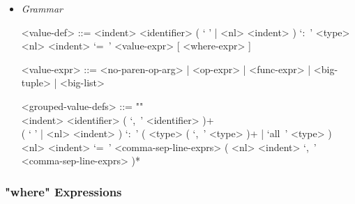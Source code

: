 \documentclass{article}
\begin{document}
\begin{itemize}
\item \textit{Grammar}
\begin{grammar}
<value-def> ::= 
<indent> <identifier> 
( ` ' | <nl> <indent> ) `:\ ' <type> 
<nl> <indent> `=\ ' <value-expr> [ <where-expr> ]

<value-expr> ::=
<no-paren-op-arg> | <op-expr> | <func-expr> | <big-tuple> | <big-list>

<grouped-value-defs> ::= ""\\
<indent> <identifier> ( `,\ ' <identifier> )+ \\
( ` ' | <nl> <indent> ) `:\ ' ( <type> ( `,\ ' <type> )+ | `all\ ' <type> ) \\
<nl> <indent> `=\ '
<comma-sep-line-exprs> ( <nl> <indent> `,\ ' <comma-sep-line-exprs> )*
\end{grammar}

\end{itemize}

\subsubsection{"where" Expressions}
\end{document}
